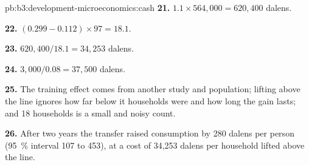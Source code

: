 \begin{solution}{pb:b3:development-microeconomics:cash}
\textbf{21.} $1.1 \times 564{,}000 = 620{,}400$ dalens.

\textbf{22.} $(0.299 - 0.112) \times 97 = 18.1$.

\textbf{23.} $620{,}400/18.1 = 34{,}253$ dalens.

\textbf{24.} $3{,}000/0.08 = 37{,}500$ dalens.

\textbf{25.} The training effect comes from another study and population; lifting above
the line ignores how far below it households were and how long the gain lasts; and
18 households is a small and noisy count.

\textbf{26.} After two years the transfer raised consumption by 280 dalens per person (95~\% interval 107 to 453), at a
cost of 34{,}253 dalens per household lifted above the line.
\end{solution}
